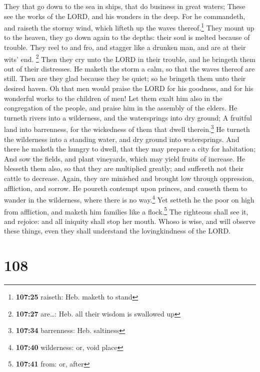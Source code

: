  They that go down to the sea in ships, that do business
in great waters;  These see the works of the LORD, and
his wonders in the deep.  For he commandeth, and raiseth
the stormy wind, which lifteth up the waves thereof.\footnote{\textbf{107:25}
  raiseth: Heb. maketh to stand}  They mount up to the
heaven, they go down again to the depths: their soul is melted because
of trouble.  They reel to and fro, and stagger like a
drunken man, and are at their wits' end. \footnote{\textbf{107:27}
  are\ldots: Heb. all their wisdom is swallowed up}  Then
they cry unto the LORD in their trouble, and he bringeth them out of
their distresses.  He maketh the storm a calm, so that
the waves thereof are still.  Then are they glad because
they be quiet; so he bringeth them unto their desired haven.
 Oh that men would praise the LORD for his goodness, and
for his wonderful works to the children of men!  Let them
exalt him also in the congregation of the people, and praise him in the
assembly of the elders.  He turneth rivers into a
wilderness, and the watersprings into dry ground;  A
fruitful land into barrenness, for the wickedness of them that dwell
therein.\footnote{\textbf{107:34} barrenness: Heb. saltiness}
 He turneth the wilderness into a standing water, and dry
ground into watersprings.  And there he maketh the hungry
to dwell, that they may prepare a city for habitation; 
And sow the fields, and plant vineyards, which may yield fruits of
increase.  He blesseth them also, so that they are
multiplied greatly; and suffereth not their cattle to decrease.
 Again, they are minished and brought low through
oppression, affliction, and sorrow.  He poureth contempt
upon princes, and causeth them to wander in the wilderness, where there
is no way.\footnote{\textbf{107:40} wilderness: or, void place}
 Yet setteth he the poor on high from affliction, and
maketh him families like a flock.\footnote{\textbf{107:41} from: or,
  after}  The righteous shall see it, and rejoice: and
all iniquity shall stop her mouth.  Whoso is wise, and
will observe these things, even they shall understand the lovingkindness
of the LORD.

\hypertarget{section-107}{%
\section{108}\label{section-107}}

